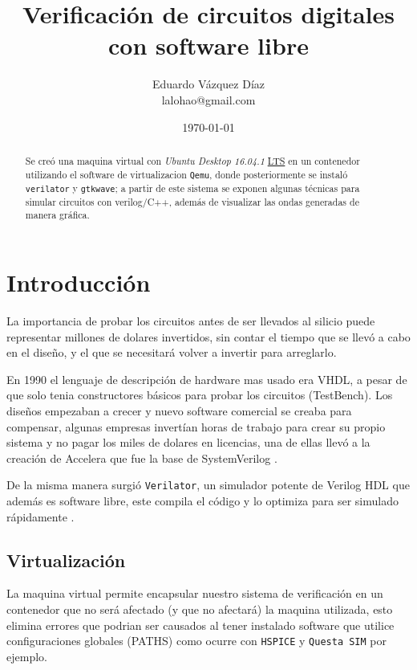 \documentclass[11pt]{/home/hao/dev/org/latex-plantilla/IEEEtran}
\author{Eduardo Vázquez Díaz \\ lalohao@gmail.com}
\date{\today}
\title{Verificación de circuitos digitales con software libre}
\begin{document}
\maketitle
\tableofcontents

\begin{abstract}
Se creó una maquina virtual con \emph{Ubuntu Desktop 16.04.1} \uline{LTS} en un
contenedor utilizando el software de virtualizacion \texttt{Qemu}, donde
posteriormente se instaló \texttt{verilator} y \texttt{gtkwave}; a partir de este
sistema se exponen algunas técnicas para simular circuitos con
verilog/C++, además de visualizar las ondas generadas de manera
gráfica.
\end{abstract}

\section{Introducción}
\label{sec:org7a2e3d2}
La importancia de probar los circuitos antes de ser llevados al silicio
puede representar millones de dolares invertidos, sin contar el
tiempo que se llevó a cabo en el diseño, y el que se necesitará
volver a invertir para arreglarlo.

En 1990 el lenguaje de descripción de hardware mas usado era VHDL, a
pesar de que solo tenia constructores básicos para probar los
circuitos (TestBench). Los diseños empezaban a crecer y nuevo
software comercial se creaba para compensar, algunas empresas
invertían horas de trabajo para crear su propio sistema y no pagar
los miles de dolares en licencias, una de ellas llevó a la creación
de Accelera que fue la base de SystemVerilog \cite{spear08_system}.

De la misma manera surgió \texttt{Verilator}, un simulador potente de
Verilog HDL que además es software libre, este compila el código y
lo optimiza para ser simulado rápidamente \cite{verilator-intro}.
\subsection{Virtualización}
\label{sec:org812a018}
La maquina virtual permite encapsular nuestro sistema de
verificación en un contenedor que no será afectado (y que no
afectará) la maquina utilizada, esto elimina errores que podrian ser
causados al tener instalado software que utilice configuraciones
globales (PATHS) como ocurre con \texttt{HSPICE} y \texttt{Questa SIM} por
ejemplo.
\end{document}
